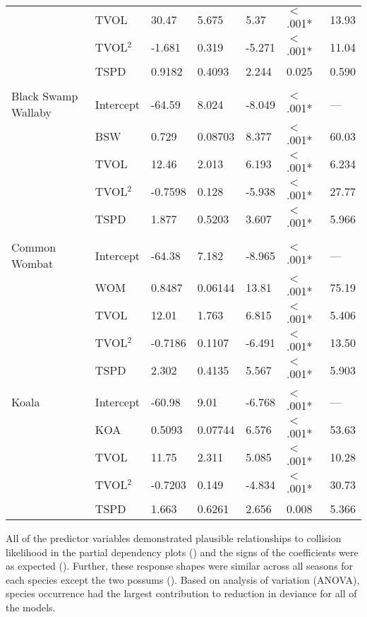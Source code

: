 \begin{table}[htp]
\begin{tabularx}{0.9\textwidth}{lllllll}
   & TVOL & 30.47 & 5.675 & 5.37 & $<$.001* & 13.93 \\ 
   & TVOL$^2$ & -1.681 & 0.319 & -5.271 & $<$.001* & 11.04 \\ 
   & TSPD & 0.9182 & 0.4093 & 2.244 & 0.025 & 0.590 \\ 
   &  &  &  &  &  &  \\ 
Black Swamp Wallaby & Intercept & -64.59 & 8.024 & -8.049 & $<$.001* & --- \\ 
   & BSW & 0.729 & 0.08703 & 8.377 & $<$.001* & 60.03 \\ 
   & TVOL & 12.46 & 2.013 & 6.193 & $<$.001* & 6.234 \\ 
   & TVOL$^2$ & -0.7598 & 0.128 & -5.938 & $<$.001* & 27.77 \\ 
   & TSPD & 1.877 & 0.5203 & 3.607 & $<$.001* & 5.966 \\ 
   &  &  &  &  &  &  \\ 
Common Wombat & Intercept & -64.38 & 7.182 & -8.965 & $<$.001* & --- \\ 
   & WOM & 0.8487 & 0.06144 & 13.81 & $<$.001* & 75.19 \\ 
   & TVOL & 12.01 & 1.763 & 6.815 & $<$.001* & 5.406 \\ 
   & TVOL$^2$ & -0.7186 & 0.1107 & -6.491 & $<$.001* & 13.50 \\ 
   & TSPD & 2.302 & 0.4135 & 5.567 & $<$.001* & 5.903 \\ 
   &  &  &  &  &  &  \\ 
Koala & Intercept & -60.98 & 9.01 & -6.768 & $<$.001* & --- \\ 
   & KOA & 0.5093 & 0.07744 & 6.576 & $<$.001* & 53.63 \\ 
   & TVOL & 11.75 & 2.311 & 5.085 & $<$.001* & 10.28 \\ 
   & TVOL$^2$ & -0.7203 & 0.149 & -4.834 & $<$.001* & 30.73 \\ 
   & TSPD & 1.663 & 0.6261 & 2.656 & 0.008 & 5.366 \\  
\bottomrule
\end{tabularx}
\label{6sp_sum_coll}
\end{table}

All of the predictor variables demonstrated plausible relationships to collision likelihood in the partial dependency plots () and the signs of the coefficients were as expected (). Further, these response shapes were similar across all seasons for each species except the two possums (). Based on analysis of variation (ANOVA), species occurrence had the largest contribution to reduction in deviance for all of the models.

